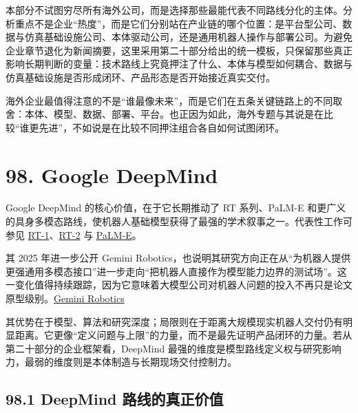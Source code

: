 

本部分不试图穷尽所有海外公司，而是选择那些最能代表不同路线分化的主体。分析重点不是企业“热度”，而是它们分别站在产业链的哪个位置：是平台型公司、数据与仿真基础设施公司、本体驱动公司，还是通用机器人操作与部署公司。为避免企业章节退化为新闻摘要，这里采用第二十部分给出的统一模板，只保留那些真正影响长期判断的变量：技术路线上究竟押注了什么、本体与模型如何耦合、数据与仿真基础设施是否形成闭环、产品形态是否开始接近真实交付。

海外企业最值得注意的不是“谁最像未来”，而是它们在五条关键链路上的不同取舍：本体、模型、数据、部署、平台。也正因为如此，海外专题与其说是在比较“谁更先进”，不如说是在比较不同押注组合各自如何试图闭环。

\section*{98. Google DeepMind}

Google DeepMind 的核心价值，在于它长期推动了 RT 系列、PaLM-E 和更广义的具身多模态路线，使机器人基础模型获得了最强的学术叙事之一。代表性工作可参见 \href{https://arxiv.org/abs/2212.06817}{RT-1}、\href{https://arxiv.org/abs/2307.15818}{RT-2} 与 \href{https://arxiv.org/abs/2303.03378}{PaLM-E}。

其 2025 年进一步公开 Gemini Robotics，也说明其研究方向正在从“为机器人提供更强通用多模态接口”进一步走向“把机器人直接作为模型能力边界的测试场”。这一变化值得持续跟踪，因为它意味着大模型公司对机器人问题的投入不再只是论文原型级别。\href{https://deepmind.google/blog/gemini-robotics-brings-ai-into-the-physical-world/}{Gemini Robotics}

其优势在于模型、算法和研究深度；局限则在于距离大规模现实机器人交付仍有明显距离。它更像“定义问题与上限”的力量，而不是最先证明产品闭环的力量。若从第二十部分的企业框架看，DeepMind 最强的维度是模型路线定义权与研究影响力，最弱的维度则是本体制造与长期现场交付控制力。

\subsection*{98.1 DeepMind 路线的真正价值}


